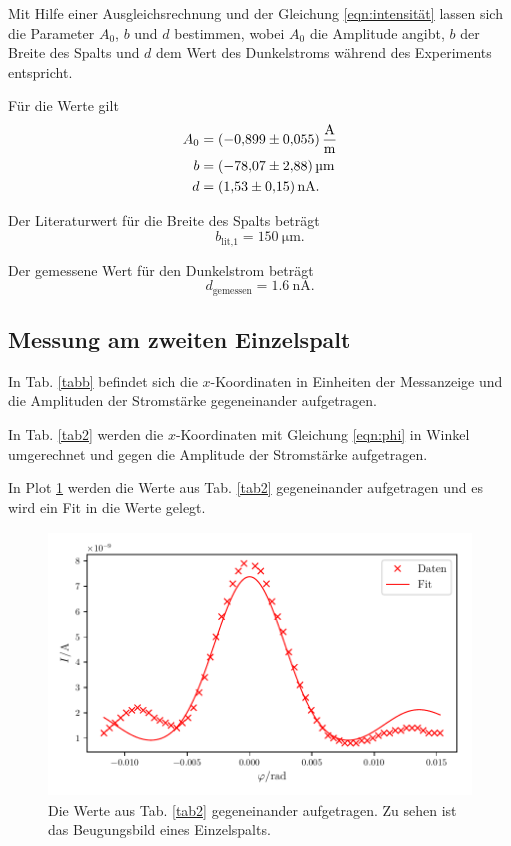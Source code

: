 \noindent Mit Hilfe einer Ausgleichsrechnung und der Gleichung \eqref{eqn:intensität} lassen sich die Parameter $A_0$, $b$ und $d$ bestimmen, wobei $A_0$ die Amplitude angibt, $b$ der Breite des Spalts und $d$ dem Wert des Dunkelstroms während des Experiments entspricht. 

\noindent Für die Werte gilt
\begin{align*}
    A_0 &= \SI{-0.899(055)}{\ampere\per\meter} \\
    b &= \SI{-78.07 \pm 2.88}{\micro\meter} \\
    d &= \SI{1.53(15)}{\nano\ampere}.
\end{align*}

\noindent Der Literaturwert für die Breite des Spalts beträgt
\begin{equation*}
    b_\text{lit,1} = \SI{150}{\micro\meter}.
\end{equation*}

\noindent Der gemessene Wert für den Dunkelstrom beträgt 
\begin{equation*}
    d_\text{gemessen}= \SI{1.6}{\nano\ampere}.
\end{equation*}


\subsection{Messung am zweiten Einzelspalt}
In Tab. \ref{tabb} befindet sich die $x$-Koordinaten in Einheiten der Messanzeige und die Amplituden der Stromstärke gegeneinander aufgetragen. 



\noindent In Tab. \ref{tab2} werden die $x$-Koordinaten mit Gleichung \eqref{eqn:phi} in Winkel umgerechnet und gegen die Amplitude der Stromstärke aufgetragen. 



\noindent In Plot \ref{fig:plot2} werden die Werte aus Tab. \ref{tab2} gegeneinander aufgetragen und es wird ein Fit in die Werte gelegt. 
\begin{figure}
    \centering
    \includegraphics[width=12cm, height=7cm]{build/plot2.pdf}
    \caption{Die Werte aus Tab. \ref{tab2} gegeneinander aufgetragen.
    Zu sehen ist das Beugungsbild eines Einzelspalts.}
    \label{fig:plot2}
\end{figure}

